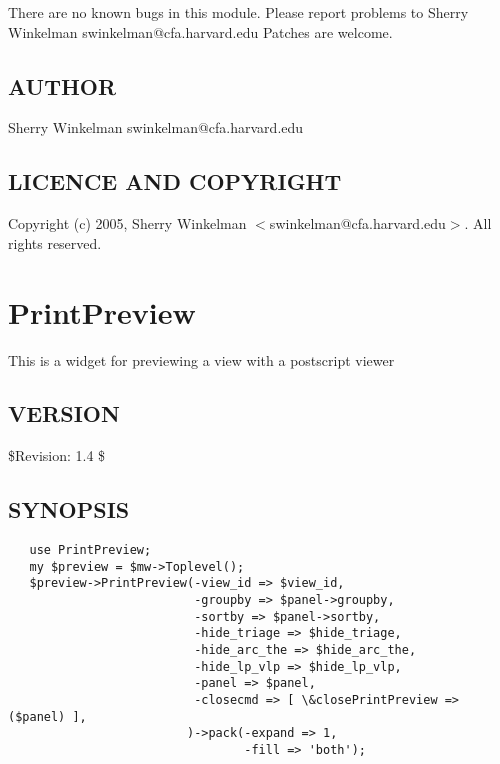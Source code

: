 \documentclass{article}
\begin{document}
There are no known bugs in this module.
Please report problems to Sherry Winkelman swinkelman@cfa.harvard.edu
Patches are welcome.

\subsection*{AUTHOR\label{Print_AUTHOR}}


Sherry Winkelman swinkelman@cfa.harvard.edu

\subsection*{LICENCE AND COPYRIGHT\label{Print_LICENCE_AND_COPYRIGHT}}


Copyright (c) 2005, Sherry Winkelman $<$swinkelman@cfa.harvard.edu$>$. All rights 
reserved.

\clearpage
\section{PrintPreview\label{PrintPreview}}


This is a widget for previewing a view with a postscript
viewer

\subsection*{VERSION\label{PrintPreview_VERSION}}


\$Revision: 1.4 \$

\subsection*{SYNOPSIS\label{PrintPreview_SYNOPSIS}}
\begin{verbatim}
   use PrintPreview;
   my $preview = $mw->Toplevel();
   $preview->PrintPreview(-view_id => $view_id,
                          -groupby => $panel->groupby,
                          -sortby => $panel->sortby,
                          -hide_triage => $hide_triage,
                          -hide_arc_the => $hide_arc_the,
                          -hide_lp_vlp => $hide_lp_vlp,
                          -panel => $panel,
                          -closecmd => [ \&closePrintPreview => ($panel) ],
                         )->pack(-expand => 1,
                                 -fill => 'both');
\end{verbatim}
\end{document}
